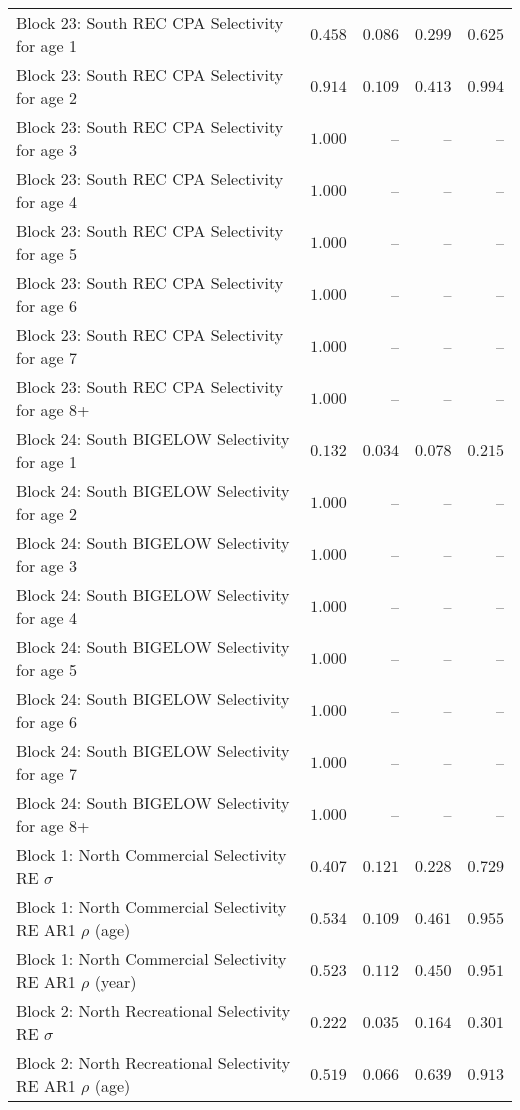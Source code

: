 \documentclass[
]{article}
\begin{document}
\begin{landscape}
\begin{longtable}[t]{lrrrr}
Block 23: South REC CPA Selectivity for age 1 & $0.458$ & $0.086$ & $0.299$ & $0.625$\\
Block 23: South REC CPA Selectivity for age 2 & $0.914$ & $0.109$ & $0.413$ & $0.994$\\
\addlinespace
Block 23: South REC CPA Selectivity for age 3 & $1.000$ & -- & -- & --\\
Block 23: South REC CPA Selectivity for age 4 & $1.000$ & -- & -- & --\\
Block 23: South REC CPA Selectivity for age 5 & $1.000$ & -- & -- & --\\
Block 23: South REC CPA Selectivity for age 6 & $1.000$ & -- & -- & --\\
Block 23: South REC CPA Selectivity for age 7 & $1.000$ & -- & -- & --\\
\addlinespace
Block 23: South REC CPA Selectivity for age 8+ & $1.000$ & -- & -- & --\\
Block 24: South BIGELOW Selectivity for age 1 & $0.132$ & $0.034$ & $0.078$ & $0.215$\\
Block 24: South BIGELOW Selectivity for age 2 & $1.000$ & -- & -- & --\\
Block 24: South BIGELOW Selectivity for age 3 & $1.000$ & -- & -- & --\\
Block 24: South BIGELOW Selectivity for age 4 & $1.000$ & -- & -- & --\\
\addlinespace
Block 24: South BIGELOW Selectivity for age 5 & $1.000$ & -- & -- & --\\
Block 24: South BIGELOW Selectivity for age 6 & $1.000$ & -- & -- & --\\
Block 24: South BIGELOW Selectivity for age 7 & $1.000$ & -- & -- & --\\
Block 24: South BIGELOW Selectivity for age 8+ & $1.000$ & -- & -- & --\\
Block 1: North Commercial Selectivity RE $\sigma$ & $0.407$ & $0.121$ & $0.228$ & $0.729$\\
\addlinespace
Block 1: North Commercial Selectivity RE AR1 $\rho$ (age) & $0.534$ & $0.109$ & $0.461$ & $0.955$\\
Block 1: North Commercial Selectivity RE AR1 $\rho$ (year) & $0.523$ & $0.112$ & $0.450$ & $0.951$\\
Block 2: North Recreational Selectivity RE $\sigma$ & $0.222$ & $0.035$ & $0.164$ & $0.301$\\
Block 2: North Recreational Selectivity RE AR1 $\rho$ (age) & $0.519$ & $0.066$ & $0.639$ & $0.913$\\

\end{longtable}
\end{landscape}
\end{document}
